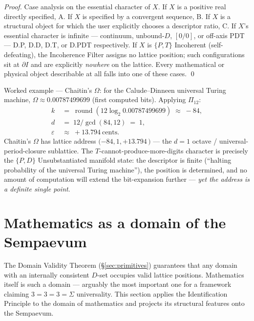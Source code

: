 \documentclass[11pt,a4paper]{article}
\theoremstyle{definition}
\theoremstyle{remark}
\DeclareMathOperator{\round}{round}
\newcommand{\eps}{\varepsilon}
\begin{document}
\begin{proof}
Case analysis on the essential character of $X$. If $X$ is a positive real directly specified, A. If $X$ is specified by a convergent sequence, B. If $X$ is a structural object for which the user explicitly chooses a descriptor ratio, C. If $X$'s essential character is infinite --- continuum, unbound-$D$, $[0/0]$, or off-axis PDT --- D.P, D.D, D.T, or D.PDT respectively. If $X$ is $\{P,T\}$ Incoherent (self-defeating), the Incoherence Filter assigns no lattice position; such configurations sit at $\partial I$ and are explicitly \emph{nowhere} on the lattice. Every mathematical or physical object describable at all falls into one of these cases. \qed
\end{proof}

Worked example --- Chaitin's $\Omega$: for the Calude--Dinneen universal Turing machine, $\Omega \approx 0.00787499699$ (first computed bits). Applying $\Pi_{12}$:
\[
\begin{aligned}
k \;&=\; \round(12\log_{2}0.00787499699) \;\approx\; -84,\\
d \;&=\; 12/\gcd(84,12) \;=\; 1,\\
\eps \;&\approx\; +13.794\ \text{cents}.
\end{aligned}
\]
Chaitin's $\Omega$ has lattice address $(-84, 1, +13.794$\,\textcent$)$ --- the $d=1$ octave / universal-period-closure sublattice. The $T$-cannot-produce-more-digits character is precisely the $\{P,D\}$ Unsubstantiated manifold state: the descriptor is finite (``halting probability of the universal Turing machine''), the position is determined, and no amount of computation will extend the bit-expansion further --- \emph{yet the address is a definite single point}.

\section{Mathematics as a domain of the Sempaevum}\label{sec:math-domain}

The Domain Validity Theorem (\S\ref{sec:primitives}) guarantees that any domain with an internally consistent $D$-set occupies valid lattice positions. Mathematics itself is such a domain --- arguably the most important one for a framework claiming $3=3=3=\Sigma$ universality. This section applies the Identification Principle to the domain of mathematics and projects its structural features onto the Sempaevum.
\end{document}
